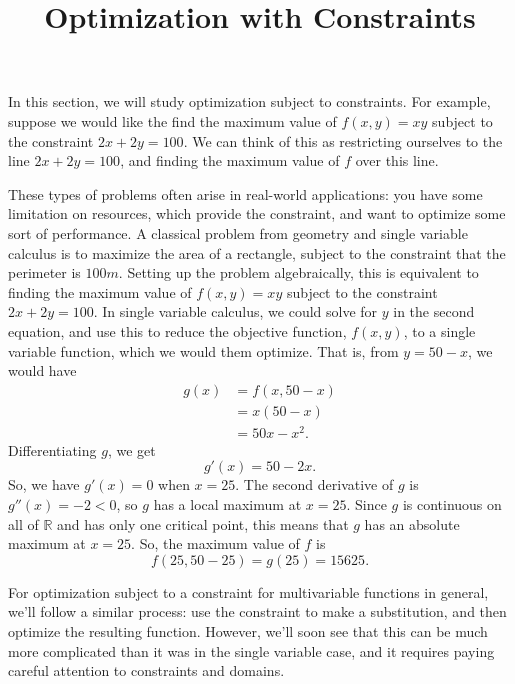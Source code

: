 \documentclass{ximera}
\title{Optimization with Constraints}
\begin{document}
\begin{abstract}
\end{abstract}
\maketitle

In this section, we will study optimization subject to constraints. For example, suppose we would like the find the maximum value of $f(x,y) = xy$ subject to the constraint $2x+2y=100$. We can think of this as restricting ourselves to the line $2x+2y=100$, and finding the maximum value of $f$ over this line.

\begin{image}
\end{image}

These types of problems often arise in real-world applications: you have some limitation on resources, which provide the constraint, and want to optimize some sort of performance. A classical problem from geometry and single variable calculus is to maximize the area of a rectangle, subject to the constraint that the perimeter is $100m$. Setting up the problem algebraically, this is equivalent to finding the maximum value of $f(x,y) = xy$ subject to the constraint $2x+2y=100$. In single variable calculus, we could solve for $y$ in the second equation, and use this to reduce the objective function, $f(x,y)$, to a single variable function, which we would them optimize. That is, from $y=50-x$, we would have
\begin{align*}
g(x) &= f(x,50-x)\\
&= x(50-x)\\
&= 50x-x^2.
\end{align*}
Differentiating $g$, we get
\[
g'(x) = 50-2x.
\]
So, we have $g'(x) = 0$ when $x = 25$. The second derivative of $g$ is $g''(x) = -2<0$, so $g$ has a local maximum at $x=25$. Since $g$ is continuous on all of $\mathbb{R}$ and has only one critical point, this means that $g$ has an absolute maximum at $x=25$. So, the maximum value of $f$ is
\[
f(25,50-25) = g(25) = 15625.
\]

For optimization subject to a constraint for multivariable functions in general, we'll follow a similar process: use the constraint to make a substitution, and then optimize the resulting function. However, we'll soon see that this can be much more complicated than it was in the single variable case, and it requires paying careful attention to constraints and domains.
\end{document}
